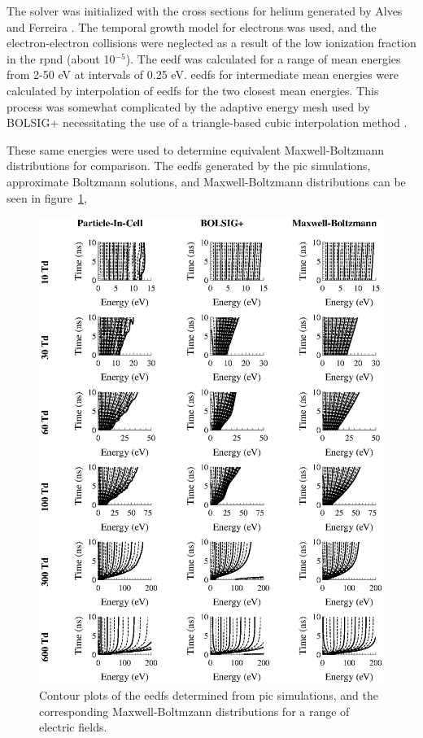 The solver was initialized with the cross sections for helium generated by Alves
and Ferreira \cite{Alves2013}. The temporal growth model for electrons was used,
and the electron-electron collisions were neglected as a result of the low
ionization fraction in the \acs{rpnd} (about 10$^{-5}$). The \acs{eedf} was
calculated for a range of mean energies from 2-50 eV at intervals of
0.25 eV. \acs{eedf}s for intermediate mean energies were calculated by
interpolation of \acs{eedf}s for the two closest mean energies. This process was
somewhat complicated by the adaptive energy mesh used by BOLSIG+ necessitating
the use of a triangle-based cubic interpolation method \cite{Jones2001}.

These same energies were used to determine equivalent Maxwell-Boltzmann
distributions for comparison. The \acs{eedf}s generated by the \acs{pic}
simulations, approximate Boltzmann solutions, and Maxwell-Boltzmann
distributions can be seen in figure~\ref{fig:picmb},
\begin{figure}
  \centering
  \includegraphics{./chapters/modeling/figures/picmb.eps}
  \caption{Contour plots of the \acs{eedf}s determined from \acs{pic}
    simulations, and the corresponding Maxwell-Boltmzann distributions for a range
    of electric fields.}
  \label{fig:picmb}
\end{figure}
